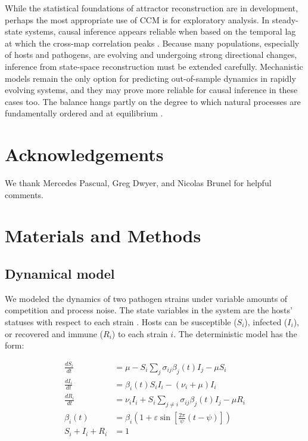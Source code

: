 \documentclass[10pt]{article}
\begin{document}
While the statistical foundations of attractor reconstruction are in development, perhaps the most appropriate use of CCM is for exploratory analysis.
In steady-state systems, causal inference appears reliable when based on the temporal lag at which the cross-map correlation peaks \cite{Ye2015}.
Because many populations, especially of hosts and pathogens, are evolving and undergoing strong directional changes, inference from state-space reconstruction must be extended carefully.
Mechanistic models remain the only option for predicting out-of-sample dynamics in rapidly evolving systems, and they may  prove more reliable for causal inference in these cases too.
The balance hangs partly on the degree to which natural processes are fundamentally ordered and at equilibrium \cite{Hastings2004}.

\section{Acknowledgements}
We thank Mercedes Pascual, Greg Dwyer, and Nicolas Brunel for helpful comments.

\section{Materials and Methods}

\subsection{Dynamical model}
We modeled the dynamics of two pathogen strains under variable amounts of competition and process noise.
The state variables in the system are the hosts' statuses with respect to each strain \cite{Gog2002}. 
Hosts can be susceptible ($S_i$), infected ($I_i$), or recovered and immune ($R_i$) to each strain $i$. 
The deterministic model has the form:

\begin{align}
\frac{dS_i}{dt} &=
    \mu
    - S_i\sum\limits_{j}
    \sigma_{ij}
    \beta_j(t) 
    I_j
    - \mu S_i \\
\frac{dI_i}{dt} &= 
    \beta_i(t) S_i I_i
    - (\nu_i + \mu) I_i \\
\frac{dR_i}{dt} &=
    \nu_i I_i
    + S_i\sum\limits_{j \neq i} \sigma_{ij} \beta_j(t)  I_j
    - \mu R_i \\
\beta_i(t) &= \beta_i
    \left(
        1 + \varepsilon \sin \left[
            \frac{2\pi}{\psi} \left( t - \psi \right)
        \right]
    \right) \\
S_i + I_i + R_i &= 1
\end{align}
\end{document}

